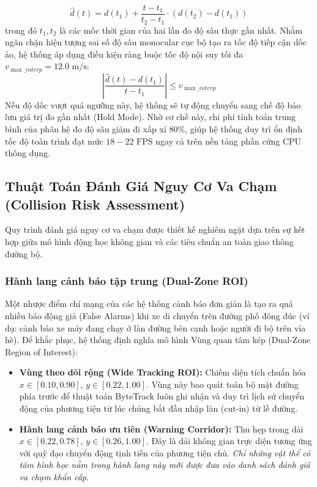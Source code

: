 \begin{equation}
\label{eq:depth_interp}
\hat{d}(t) = d(t_1) + \frac{t - t_1}{t_2 - t_1} \cdot \left( d(t_2) - d(t_1) \right)
\end{equation}
trong đó $t_1, t_2$ là các mốc thời gian của hai lần đo độ sâu thực gần nhất. Nhằm ngăn chặn hiện tượng sai số độ sâu monocular cục bộ tạo ra tốc độ tiếp cận dốc ảo, hệ thống áp dụng điều kiện ràng buộc tốc độ nội suy tối đa $v_{\max\_interp} = 12.0\text{ m/s}$:
\begin{equation}
\label{eq:depth_clamp}
\left| \frac{\hat{d}(t) - d(t_1)}{t - t_1} \right| \le v_{\max\_interp}
\end{equation}
Nếu độ dốc vượt quá ngưỡng này, hệ thống sẽ tự động chuyển sang chế độ bảo lưu giá trị đo gần nhất (Hold Mode). Nhờ cơ chế này, chi phí tính toán trung bình của phân hệ đo độ sâu giảm đi xấp xỉ $80\%$, giúp hệ thống duy trì ổn định tốc độ toàn trình đạt mức $18 - 22\text{ FPS}$ ngay cả trên nền tảng phần cứng CPU thông dụng.

\subsection{Thuật Toán Đánh Giá Nguy Cơ Va Chạm (Collision Risk Assessment)}
\label{subsec:thuat_toan_danh_gia_nguy_co}

Quy trình đánh giá nguy cơ va chạm được thiết kế nghiêm ngặt dựa trên sự kết hợp giữa mô hình động học không gian và các tiêu chuẩn an toàn giao thông đường bộ.

\subsubsection{Hành lang cảnh báo tập trung (Dual-Zone ROI)}
Một nhược điểm chí mạng của các hệ thống cảnh báo đơn giản là tạo ra quá nhiều báo động giả (False Alarms) khi xe di chuyển trên đường phố đông đúc (ví dụ: cảnh báo xe máy đang chạy ở làn đường bên cạnh hoặc người đi bộ trên vỉa hè). Để khắc phục, hệ thống định nghĩa mô hình Vùng quan tâm kép (Dual-Zone Region of Interest):
\begin{itemize}
    \item \textbf{Vùng theo dõi rộng (Wide Tracking ROI):} Chiếm diện tích chuẩn hóa $x \in [0.10, 0.90]$, $y \in [0.22, 1.00]$. Vùng này bao quát toàn bộ mặt đường phía trước để thuật toán ByteTrack luôn ghi nhận và duy trì lịch sử chuyển động của phương tiện từ lúc chúng bắt đầu nhập làn (cut-in) từ lề đường.
    \item \textbf{Hành lang cảnh báo ưu tiên (Warning Corridor):} Thu hẹp trong dải $x \in [0.22, 0.78]$, $y \in [0.26, 1.00]$. Đây là dải không gian trực diện tương ứng với quỹ đạo chuyển động tịnh tiến của phương tiện chủ. \textit{Chỉ những vật thể có tâm hình học nằm trong hành lang này mới được đưa vào danh sách đánh giá va chạm khẩn cấp}.
\end{itemize}

